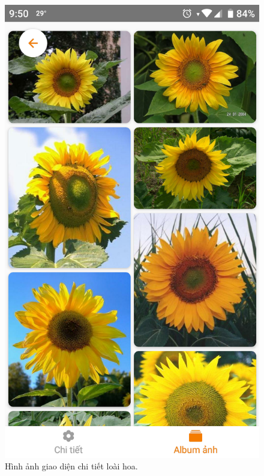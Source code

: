 \documentclass[12pt]{report}
\begin{document}
\begin{figure}[h]
			\includegraphics[scale=0.18]{app_detail2}
			\caption{Hình ảnh giao diện chi tiết loài hoa.}
			\label{fig:app_detail}
		\end{figure}
				
\end{document}

